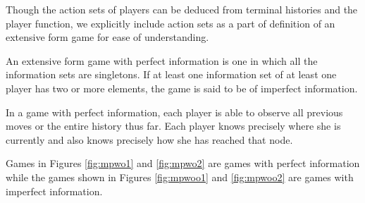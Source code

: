 \begin{note}
	Though the action sets of players can be deduced from terminal histories and the player function, we explicitly include action sets as a part of definition of an extensive form game for ease of understanding.
\end{note}
\begin{defn}
	An extensive form game with perfect information is one in which all the information sets are singletons.
	If at least one information set of at least one player has two or more elements, the game is said to be of imperfect information.
\end{defn}
In a game with perfect information, each player is able to observe all previous moves or the entire history thus far.
Each player knows precisely where she is currently and also knows precisely how she has reached that node.

Games in Figures \ref{fig:mpwo1} and \ref{fig:mpwo2} are games with perfect information while the games shown in Figures \ref{fig:mpwoo1} and \ref{fig:mpwoo2} are games with imperfect information.